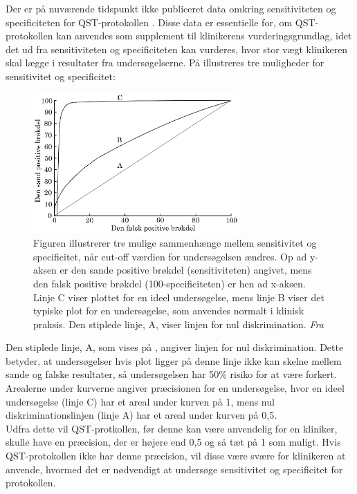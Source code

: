 Der er på nuværende tidspunkt ikke publiceret data omkring sensitiviteten og specificiteten for QST-protokollen \citep{Wylde2013}. Disse data er essentielle for, om QST-protokollen kan anvendes som supplement til klinikerens vurderingsgrundlag, idet det ud fra sensitiviteten og specificiteten kan vurderes, hvor stor vægt klinikeren skal lægge i resultater fra undersøgelserne. På  illustreres tre muligheder for sensitivitet og specificitet:

\begin{figure}[H]
\centering
\includegraphics[width=0.7\textwidth]{figures/dHTAanalyse/AUC}
\caption{Figuren illustrerer tre mulige sammenhænge mellem sensitivitet og specificitet, når cut-off værdien for undersøgelsen ændres. Op ad y-aksen er den sande positive brøkdel (sensitiviteten) angivet, mens den falsk positive brøkdel (100-specificiteten) er hen ad x-aksen. Linje C viser plottet for en ideel undersøgelse, mens linje B viser det typiske plot for en undersøgelse, som anvendes normalt i klinisk praksis. Den stiplede linje, A, viser linjen for nul diskrimination. \textit{Fra }}\label{fig:AUC}
\end{figure}

Den stiplede linje, A, som vises på , angiver linjen for nul diskrimination. Dette betyder, at undersøgelser hvis plot ligger på denne linje ikke kan skelne mellem sande og falske resultater, så undersøgelsen har 50\% risiko for at være forkert. Arealerne under kurverne angiver præcisionen for en undersøgelse, hvor en ideel undersøgelse (linje C) har et areal under kurven på 1, mens nul diskriminationslinjen (linje A) har et areal under kurven på 0,5. \\
Udfra dette vil QST-protkollen, før denne kan være anvendelig for en kliniker, skulle have en præcision, der er højere end 0,5 og så tæt på 1 som muligt. Hvis QST-protokollen ikke har denne præcision, vil disse være svære for klinikeren at anvende, hvormed det er nødvendigt at undersøge sensitivitet og specificitet for protokollen.   

